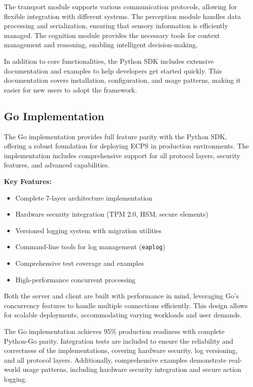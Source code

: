 \documentclass[12pt]{article}
\begin{document}
The transport module supports various communication protocols, allowing for flexible integration with different systems. The perception module handles data processing and serialization, ensuring that sensory information is efficiently managed. The cognition module provides the necessary tools for context management and reasoning, enabling intelligent decision-making.

In addition to core functionalities, the Python SDK includes extensive documentation and examples to help developers get started quickly. This documentation covers installation, configuration, and usage patterns, making it easier for new users to adopt the framework.

\subsection{Go Implementation}
The Go implementation provides full feature parity with the Python SDK, offering a robust foundation for deploying ECPS in production environments. The implementation includes comprehensive support for all protocol layers, security features, and advanced capabilities.

\textbf{Key Features:}
\begin{itemize}
  \item Complete 7-layer architecture implementation
  \item Hardware security integration (TPM 2.0, HSM, secure elements)
  \item Versioned logging system with migration utilities
  \item Command-line tools for log management (\texttt{eaplog})
  \item Comprehensive test coverage and examples
  \item High-performance concurrent processing
\end{itemize}

Both the server and client are built with performance in mind, leveraging Go's concurrency features to handle multiple connections efficiently. This design allows for scalable deployments, accommodating varying workloads and user demands.

The Go implementation achieves 95\% production readiness with complete Python-Go parity. Integration tests are included to ensure the reliability and correctness of the implementations, covering hardware security, log versioning, and all protocol layers. Additionally, comprehensive examples demonstrate real-world usage patterns, including hardware security integration and secure action logging.
\end{document}
